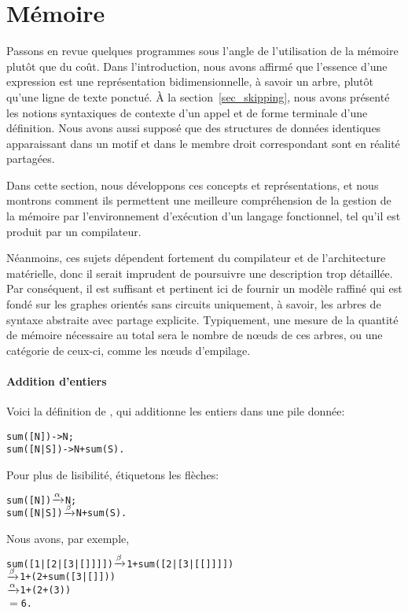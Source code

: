 \section{Mémoire}
\label{sec_memory}

Passons en revue quelques programmes sous l'angle de l'utilisation de
la mémoire plutôt que du coût. Dans l'introduction, nous avons affirmé
que l'essence d'une expression est une représentation
bidimensionnelle, à savoir un arbre, plutôt qu'une ligne de texte
ponctué. À la section~\vref{sec_skipping}, nous avons présenté les
notions syntaxiques de contexte d'un appel et de forme terminale d'une
définition. Nous avons aussi supposé que des structures de données
identiques apparaissant dans un motif et dans le membre droit
correspondant sont en réalité partagées.

Dans cette section, nous développons ces concepts et représentations,
et nous montrons comment ils permettent une meilleure compréhension de
la gestion de la mémoire par l'environnement d'exécution d'un langage
fonctionnel, tel qu'il est produit par un compilateur.

Néanmoins, ces sujets dépendent fortement du compilateur et de
l'architecture matérielle, donc il serait imprudent de poursuivre une
description trop détaillée. Par conséquent, il est suffisant et
pertinent ici de fournir un modèle raffiné qui est fondé sur les
graphes orientés sans circuits uniquement, à savoir, les arbres de
syntaxe abstraite avec partage explicite. Typiquement,
une mesure de la quantité de mémoire nécessaire au total sera le
nombre de n{\oe}uds de ces arbres, ou une catégorie de ceux-ci, comme
les n{\oe}uds d'empilage.

\paragraph{Addition d'entiers}

Voici la définition de , qui additionne les entiers
dans une pile donnée:
\begin{alltt}
sum([N])   -> N;
sum([N|S]) -> N + sum(S).
\end{alltt}
Pour plus de lisibilité, étiquetons les flèches:
\begin{alltt}
sum([N])   \(\xrightarrow{\smash[t]{\alpha}}\) N;
sum([N|S]) \(\xrightarrow{\smash[t]{\beta}}\) N + sum(S).
\end{alltt}
Nous avons, par exemple,
\begin{alltt}
sum([1|[2|[3|[]]]]) \(\xrightarrow{\smash[t]{\beta}}\) 1 + sum([2|[3|[[]]]])
                    \(\xrightarrow{\smash[t]{\beta}}\) 1 + (2 + sum([3|[]]))
                    \(\xrightarrow{\smash[t]{\alpha}}\) 1 + (2 + (3))
                    \(=\) 6.
\end{alltt}

